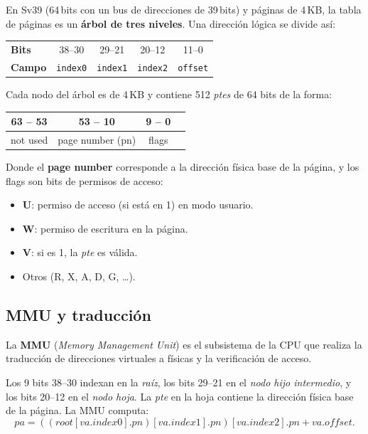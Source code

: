 \documentclass[11pt,a4paper]{article}
\begin{document}
En Sv39 (64\,bits con un bus de direcciones de 39\,bits) y páginas de
4\,KB, la tabla de páginas es un \textbf{árbol de tres niveles}. Una
dirección lógica se divide así:

\begin{center}
\begin{tabular}{@{}lcccc@{}}
\toprule
\textbf{Bits} & 38--30 & 29--21 & 20--12 & 11--0 \\
\textbf{Campo} & \texttt{index0} & \texttt{index1} & \texttt{index2} & \texttt{offset} \\
\bottomrule
\end{tabular}
\end{center}

Cada nodo del árbol es de 4\,KB y contiene 512 \emph{ptes} de 64 bits
de la forma:

\begin{center}
\begin{tabular}{@{}cccc@{}}
\toprule
63 -- 53     & 53 -- 10 & 9 -- 0 \\
\midrule
not used     & page number (pn) & flags \\
\bottomrule
\end{tabular}
\end{center}

Donde el \textbf{page number} corresponde a la dirección física base
de la página, y los flags son bits de permisos de acceso:

\begin{itemize}[leftmargin=*,nosep]
    \item \textbf{U}: permiso de acceso (si está en 1) en modo usuario.
    \item \textbf{W}: permiso de escritura en la página.
    \item \textbf{V}: si es 1, la \emph{pte} es válida.
    \item Otros (R, X, A, D, G, \ldots).
\end{itemize}

\subsection{MMU y traducción}

\begin{definicion}
La \textbf{MMU} (\emph{Memory Management Unit}) es el subsistema de la
CPU que realiza la traducción de direcciones virtuales a físicas y
la verificación de acceso.
\end{definicion}

Los 9 bits 38--30 indexan en la \emph{raíz}, los bits 29--21 en el
\emph{nodo hijo intermedio}, y los bits 20--12 en el \emph{nodo hoja}.
La \emph{pte} en la hoja contiene la dirección física base de la
página. La MMU computa:
\[
\textit{pa} = ((\textit{root}[\textit{va}.\textit{index0}].\textit{pn})[\textit{va}.\textit{index1}].\textit{pn})[\textit{va}.\textit{index2}].\textit{pn} + \textit{va}.\textit{offset}.
\]
\end{document}
